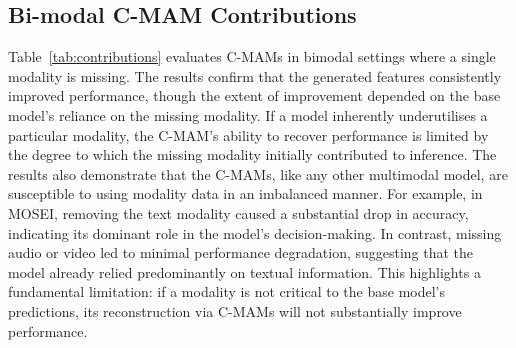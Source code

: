 

\subsection{Bi-modal C-MAM Contributions}\label{sec:contrib}
Table~\ref{tab:contributions} evaluates C-MAMs in bimodal settings where a single modality is missing. The results confirm that the generated features consistently improved performance, though the extent of improvement depended on the base model's reliance on the missing modality. If a model inherently underutilises a particular modality, the C-MAM's ability to recover performance is limited by the degree to which the missing modality initially contributed to inference. The results also demonstrate that the C-MAMs, like any other multimodal model, are susceptible to using modality data in an imbalanced manner. For example, in MOSEI, removing the text modality caused a substantial drop in accuracy, indicating its dominant role in the model's decision-making. In contrast, missing audio or video led to minimal performance degradation, suggesting that the model already relied predominantly on textual information. This highlights a fundamental limitation: if a modality is not critical to the base model's predictions, its reconstruction via C-MAMs will not substantially improve performance.



